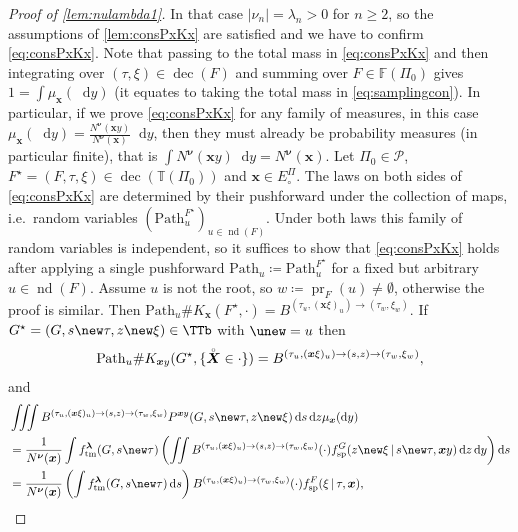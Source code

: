 \documentclass[reqno,draft]{amsart}
\numberwithin{equation}{section}
\theoremstyle{plain}
\theoremstyle{remark}
\newcommand*\diff{\mathop{}\!\mathrm{d}}
\DeclareMathOperator{\pr}{pr}
\newcommand{\fpart}{\Pi} %
\DeclareMathOperator{\nd}{nd}
\DeclareMathOperator{\dcb}{dec}
\newcommand{\pth}{\mathrm{Path}}
\newcommand{\ftm}{f_\mathrm{tm}^{\boldsymbol \lambda}}
\newcommand{\fsp}{f_\mathrm{sp}}
\newcommand{\nut}[1]{|\nu_{#1}|}
\newcommand{\rs}[1]{\accentset{\circ}{#1}} %
\begin{document}
\begin{proof}[Proof of \cref{lem:nulambda1}]
    In that case $\nut{n} = \lambda_n > 0$ for $n\ge 2$, so the assumptions of \cref{lem:consPxKx} are satisfied and we have to confirm \cref{eq:consPxKx}. Note that passing to the total mass in \cref{eq:consPxKx} and then integrating over $(\tau,\xi) \in \dcb(F)$ and summing over $F\in \mathbb{F}(\fpart_0)$ gives $1 = \int \mu_{\boldsymbol x}(\diff y)$ (it equates to taking the total mass in \cref{eq:samplingcon}). In particular, if we prove \cref{eq:consPxKx} for any family of measures, in this case $\mu_{\boldsymbol x}(\diff y) = \frac{N^{\boldsymbol\nu}(\boldsymbol xy)}{N^{\boldsymbol\nu}(\boldsymbol x)}\diff y$, then they must already be probability measures (in particular finite), that is $\int N^{\boldsymbol\nu}(\boldsymbol xy) \diff y = N^{\boldsymbol\nu}(\boldsymbol x)$. Let $\fpart_0\in \mathcal{P}$, $F^\star = (F,\tau,\xi)\in \dcb(\mathbb{T}(\fpart_0))$ and $\boldsymbol x\in E^\fpart_\circ $. The laws on both sides of \cref{eq:consPxKx} are determined by their pushforward under the collection of maps, i.e.\ random variables $(\pth^{F^\star}_u)_{u\in \nd(F)}$. Under both laws this family of random variables is independent, so it suffices to show that \cref{eq:consPxKx} holds after applying a single pushforward $\pth_u\coloneqq \pth^{F^\star}_u$ for a fixed but arbitrary $u\in \nd(F)$. Assume $u$ is not the root, so $w\coloneqq \pr_F(u) \neq \emptyset $, otherwise the proof is similar. Then $\pth_u\#K_{\boldsymbol x}(F^\star,\cdot ) = B^{(\tau_u,(\boldsymbol x\xi)_u) \to (\tau_w,\xi_w)}$. If $G^\star = (G,s\new\tau,z\new\xi) \in \TTb$ with $\unew = u$ then
    \begin{align*}
        \pth_u \#K_{\boldsymbol xy}(G^\star,\{\rs{\boldsymbol X}\in \cdot \}) = B^{(\tau_u,(\boldsymbol x\xi)_u)\to(s,z)\to(\tau_w,\xi_w)},
    \end{align*}
    and
    \begin{align}
        &\iiint B^{(\tau_u,(\boldsymbol x\xi)_u)\to(s,z)\to(\tau_w,\xi_w)} P^{\boldsymbol xy}(G,s\new\tau,z\new\xi) \diff s\diff z\mu_{\boldsymbol x}(\diff y)\nonumber\\
               &= \frac{1}{N^{\boldsymbol\nu}(\boldsymbol x)} \int \ftm(G,s\new\tau) \left( \iint B^{(\tau_u,(\boldsymbol x\xi)_u)\to(s,z)\to(\tau_w,\xi_w)}(\cdot ) \fsp^G(z\new\xi \,\vert\,s\new\tau,\boldsymbol xy)\diff z\diff y\right) \diff s\label{eqprf:nulambda1:1}\\
               &= \frac{1}{N^{\boldsymbol\nu}(\boldsymbol x)} \left(\int \ftm(G,s\new\tau) \diff s\right) B^{(\tau_u,(\boldsymbol x\xi)_u) \to (\tau_w,\xi_w)}(\cdot ) \fsp^F(\xi \,\vert\,\tau,\boldsymbol x) ,\nonumber

\end{align}
\end{proof}
\end{document}
